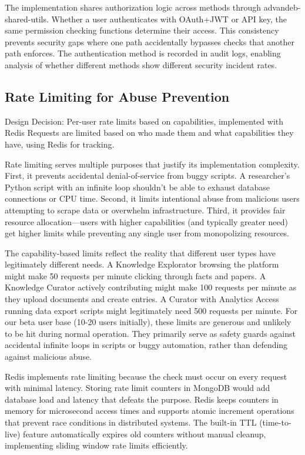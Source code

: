 \documentclass[12pt,a4paper]{article}
\begin{document}
The implementation shares authorization logic across methods through advandeb-shared-utils. Whether a user authenticates with OAuth+JWT or API key, the same permission checking functions determine their access. This consistency prevents security gaps where one path accidentally bypasses checks that another path enforces. The authentication method is recorded in audit logs, enabling analysis of whether different methods show different security incident rates.

\subsection{Rate Limiting for Abuse Prevention}

\begin{rationale}{Design Decision: Per-user rate limits based on capabilities, implemented with Redis}
Requests are limited based on who made them and what capabilities they have, using Redis for tracking.
\end{rationale}

Rate limiting serves multiple purposes that justify its implementation complexity. First, it prevents accidental denial-of-service from buggy scripts. A researcher's Python script with an infinite loop shouldn't be able to exhaust database connections or CPU time. Second, it limits intentional abuse from malicious users attempting to scrape data or overwhelm infrastructure. Third, it provides fair resource allocation—users with higher capabilities (and typically greater need) get higher limits while preventing any single user from monopolizing resources.

The capability-based limits reflect the reality that different user types have legitimately different needs. A Knowledge Explorator browsing the platform might make 50 requests per minute clicking through facts and papers. A Knowledge Curator actively contributing might make 100 requests per minute as they upload documents and create entries. A Curator with Analytics Access running data export scripts might legitimately need 500 requests per minute. For our beta user base (10-20 users initially), these limits are generous and unlikely to be hit during normal operation. They primarily serve as safety guards against accidental infinite loops in scripts or buggy automation, rather than defending against malicious abuse.

Redis implements rate limiting because the check must occur on every request with minimal latency. Storing rate limit counters in MongoDB would add database load and latency that defeats the purpose. Redis keeps counters in memory for microsecond access times and supports atomic increment operations that prevent race conditions in distributed systems. The built-in TTL (time-to-live) feature automatically expires old counters without manual cleanup, implementing sliding window rate limits efficiently.
\end{document}
